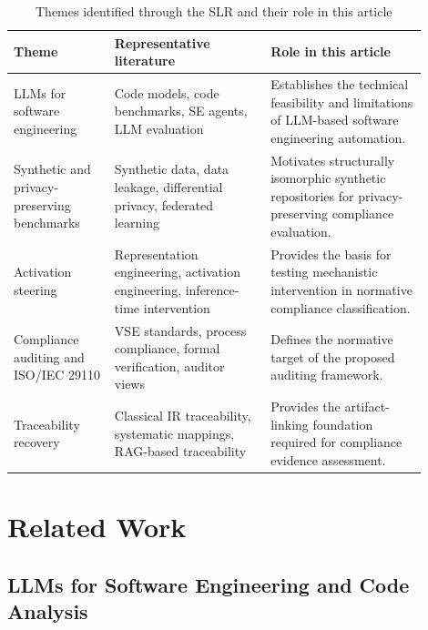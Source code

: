 \documentclass{ieeeaccess}
\begin{document}
\begin{table}[!t]
\centering
\caption{Themes identified through the SLR and their role in this article}
\label{tab:slr_themes}
\scriptsize
\begin{tabular}{p{0.22\linewidth} p{0.34\linewidth} p{0.34\linewidth}}
\toprule
\textbf{Theme} & \textbf{Representative literature} & \textbf{Role in this article} \\
\midrule
LLMs for software engineering & Code models, code benchmarks, SE agents, LLM evaluation \cite{jiang2024surveycodegen,lu2021codexglue,jimenez2023swebench,jain2024livecodebench} & Establishes the technical feasibility and limitations of LLM-based software engineering automation. \\
Synthetic and privacy-preserving benchmarks & Synthetic data, data leakage, differential privacy, federated learning \cite{bauer2024syntheticdata,yang2025swesmith,hernandez2024codeduplication,zhou2025lessleak,dwork2006differentialprivacy,mcmahan2017communication} & Motivates structurally isomorphic synthetic repositories for privacy-preserving compliance evaluation. \\
Activation steering & Representation engineering, activation engineering, inference-time intervention \cite{zou2023representation,turner2023activation,li2023iti} & Provides the basis for testing mechanistic intervention in normative compliance classification. \\
Compliance auditing and ISO/IEC 29110 & VSE standards, process compliance, formal verification, auditor views \cite{iso29110_2024,laporte2016vse,castellanos2022processcompliance,sirikrajai2025cpn,tuaycharoen2025auditorviews} & Defines the normative target of the proposed auditing framework. \\
Traceability recovery & Classical IR traceability, systematic mappings, RAG-based traceability \cite{antoniol2002traceability,borg2013traceability,fuchss2025lissa,fuchss2025llmtrace} & Provides the artifact-linking foundation required for compliance evidence assessment. \\
\bottomrule
\end{tabular}
\end{table}

\section{Related Work}
\label{sec:related_work}

\subsection{LLMs for Software Engineering and Code Analysis}
\label{subsec:rw_llms_se}
\end{document}
